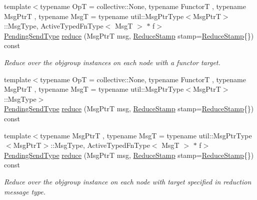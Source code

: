 \begin{DoxyCompactItemize}
\item 
{\footnotesize template$<$typename OpT  = collective\+::\+None, typename FunctorT , typename Msg\+PtrT , typename MsgT  = typename util\+::\+Msg\+Ptr\+Type$<$\+Msg\+Ptr\+T$>$\+::\+Msg\+Type, Active\+Typed\+Fn\+Type$<$ Msg\+T $>$ $\ast$ f$>$ }\\\hyperlink{structvt_1_1objgroup_1_1proxy_1_1_proxy_a1bdf8713203531d306702a024872bb08}{Pending\+Send\+Type} \hyperlink{structvt_1_1objgroup_1_1proxy_1_1_proxy_a55fdba093739d439d22076815e1ad424}{reduce} (Msg\+PtrT msg, \hyperlink{structvt_1_1objgroup_1_1proxy_1_1_proxy_a337be4c20cf11ff6477c7a66208cc909}{Reduce\+Stamp} stamp=\hyperlink{structvt_1_1objgroup_1_1proxy_1_1_proxy_a337be4c20cf11ff6477c7a66208cc909}{Reduce\+Stamp}\{\}) const
\begin{DoxyCompactList}\small\item\em Reduce over the objgroup instances on each node with a functor target. \end{DoxyCompactList}\item 
{\footnotesize template$<$typename OpT  = collective\+::\+None, typename FunctorT , typename Msg\+PtrT , typename MsgT  = typename util\+::\+Msg\+Ptr\+Type$<$\+Msg\+Ptr\+T$>$\+::\+Msg\+Type$>$ }\\\hyperlink{structvt_1_1objgroup_1_1proxy_1_1_proxy_a1bdf8713203531d306702a024872bb08}{Pending\+Send\+Type} \hyperlink{structvt_1_1objgroup_1_1proxy_1_1_proxy_a212f464e2e25a7c89db2553362e9728c}{reduce} (Msg\+PtrT msg, \hyperlink{structvt_1_1objgroup_1_1proxy_1_1_proxy_a337be4c20cf11ff6477c7a66208cc909}{Reduce\+Stamp} stamp=\hyperlink{structvt_1_1objgroup_1_1proxy_1_1_proxy_a337be4c20cf11ff6477c7a66208cc909}{Reduce\+Stamp}\{\}) const
\item 
{\footnotesize template$<$typename Msg\+PtrT , typename MsgT  = typename util\+::\+Msg\+Ptr\+Type$<$\+Msg\+Ptr\+T$>$\+::\+Msg\+Type, Active\+Typed\+Fn\+Type$<$ Msg\+T $>$ $\ast$ f$>$ }\\\hyperlink{structvt_1_1objgroup_1_1proxy_1_1_proxy_a1bdf8713203531d306702a024872bb08}{Pending\+Send\+Type} \hyperlink{structvt_1_1objgroup_1_1proxy_1_1_proxy_ad481da6a8dff55801daa9250420bae9c}{reduce} (Msg\+PtrT msg, \hyperlink{structvt_1_1objgroup_1_1proxy_1_1_proxy_a337be4c20cf11ff6477c7a66208cc909}{Reduce\+Stamp} stamp=\hyperlink{structvt_1_1objgroup_1_1proxy_1_1_proxy_a337be4c20cf11ff6477c7a66208cc909}{Reduce\+Stamp}\{\}) const
\begin{DoxyCompactList}\small\item\em Reduce over the objgroup instance on each node with target specified in reduction message type. \end{DoxyCompactList}\item 

\end{DoxyCompactItemize}
